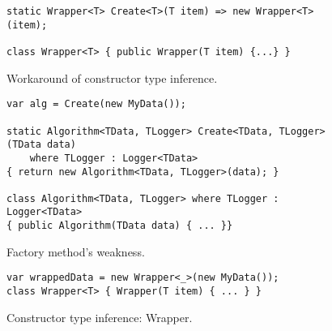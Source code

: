 \par
{}
\begin{figure}
\begin{lstlisting}[style=csharp]
static Wrapper<T> Create<T>(T item) => new Wrapper<T>(item);

class Wrapper<T> { public Wrapper(T item) {...} }
\end{lstlisting}
\caption{Workaround of constructor type inference.}
\label{img34}
\end{figure}
\par
{}
\begin{figure}
\begin{lstlisting}[style=csharp]
var alg = Create(new MyData());

static Algorithm<TData, TLogger> Create<TData, TLogger>(TData data) 
    where TLogger : Logger<TData> 
{ return new Algorithm<TData, TLogger>(data); } 

class Algorithm<TData, TLogger> where TLogger : Logger<TData> 
{ public Algorithm(TData data) { ... }}
\end{lstlisting}
\caption{Factory method's weakness.}
\label{img35}
\end{figure}
\par
{}
\begin{figure}
\begin{lstlisting}[style=csharp]
var wrappedData = new Wrapper<_>(new MyData());
class Wrapper<T> { Wrapper(T item) { ... } }
\end{lstlisting}
\caption{Constructor type inference: Wrapper.}
\label{img36}
\end{figure}
